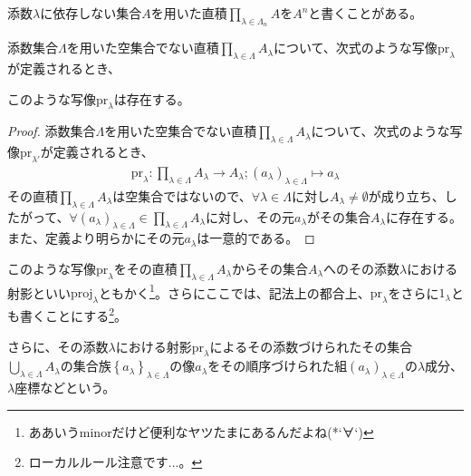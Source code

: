 \documentclass[dvipdfmx]{jsarticle}
\begin{document}
\begin{dfn}
添数$\lambda$に依存しない集合$A$を用いた直積$\prod_{\lambda \in \varLambda_{n}} A$を$A^{n}$と書くことがある。
\end{dfn}
\begin{thm}\label{1.2.5.3}
添数集合$\varLambda$を用いた空集合でない直積$\prod_{\lambda \in \varLambda} A_{\lambda}$について、次式のような写像${\mathrm{pr}}_{\lambda}$が定義されるとき、
\begin{center}
\end{center}
このような写像${\mathrm{pr}}_{\lambda}$は存在する。
\end{thm}
\begin{proof}
添数集合$\varLambda$を用いた空集合でない直積$\prod_{\lambda \in \varLambda} A_{\lambda}$について、次式のような写像${\mathrm{pr}}_{\lambda'}$が定義されるとき、
\begin{align*}
{\mathrm{pr}}_{\lambda}:\prod_{\lambda \in \varLambda} A_{\lambda} \rightarrow A_{\lambda};\left( a_{\lambda} \right)_{\lambda \in \varLambda} \mapsto a_{\lambda}
\end{align*}
その直積$\prod_{\lambda \in \varLambda} A_{\lambda}$は空集合ではないので、$\forall\lambda \in \varLambda$に対し$A_{\lambda} \neq \emptyset$が成り立ち、したがって、$\forall\left( a_{\lambda} \right)_{\lambda \in \varLambda} \in \prod_{\lambda \in \varLambda} A_{\lambda}$に対し、その元$a_{\lambda}$がその集合$A_{\lambda}$に存在する。また、定義より明らかにその元$a_{\lambda}$は一意的である。
\end{proof}
\begin{dfn}
このような写像${\mathrm{pr}}_{\lambda}$をその直積$\prod_{\lambda \in \varLambda} A_{\lambda}$からその集合$A_{\lambda}$へのその添数$\lambda$における射影といい$\mathrm{proj}_{\lambda}$ともかく\footnote{ああいうminorだけど便利なヤツたまにあるんだよね(*`∀`)}。さらにここでは、記法上の都合上、$\mathrm{pr}_\lambda $をさらに$1_\lambda $とも書くことにする\footnote{ローカルルール注意です...。}。
\end{dfn}
\begin{dfn}
さらに、その添数$\lambda$における射影${\mathrm{pr}}_{\lambda}$によるその添数づけられたその集合$\bigcup_{\lambda \in \varLambda} A_{\lambda}$の集合族$\left\{ a_{\lambda} \right\}_{\lambda \in \varLambda}$の像$a_{\lambda}$をその順序づけられた組$\left( a_{\lambda} \right)_{\lambda \in \varLambda}$の$\lambda$成分、$\lambda$座標などという。
\end{dfn}
\end{document}
